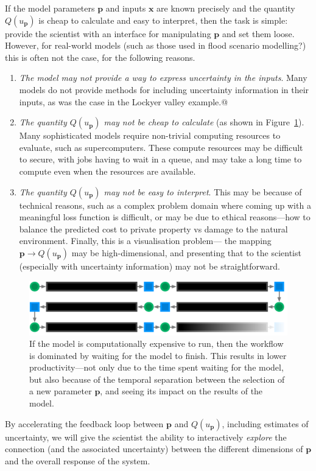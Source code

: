\documentclass[a4paper,fontsize=12pt]{scrartcl}
\begin{document}
If the model parameters $\mathbf{p}$ and inputs $\mathbf{x}$ are known
precisely and the quantity $Q(u_{\mathbf{p}})$ is cheap to calculate
and easy to interpret, then the task is simple: provide the scientist
with an interface for manipulating $\mathbf{p}$ and set them loose.
However, for real-world models (such as those used in flood scenario
modelling?) this is often not the case, for the following reasons.
\begin{enumerate}
\item \emph{The model may not provide a way to express uncertainty in
    the inputs}. Many models do not provide methods for including
  uncertainty information in their inputs, as was the case in the
  Lockyer valley example.@
\item \emph{The quantity $Q(u_{\mathbf{p}})$ may not be cheap to
    calculate} (as shown in Figure~\ref{fig:long-fb-loop.pdf}). Many
  sophisticated models require non-trivial computing resources to
  evaluate, such as supercomputers. These compute resources may be
  difficult to secure, with jobs having to wait in a queue, and may
  take a long time to compute even when the resources are available.
\item \emph{The quantity $Q(u_{\mathbf{p}})$ may not be easy to
    interpret}. This may be because of technical reasons, such as a
  complex problem domain where coming up with a meaningful loss
  function is difficult, or may be due to ethical reasons---how to
  balance the predicted cost to private property vs damage to the
  natural environment. Finally, this is a visualisation problem---
  the mapping $\mathbf{p} \rightarrow Q(u_{\mathbf{p}})$ may be high-dimensional,
  and presenting that to the scientist (especially with uncertainty
  information) may not be straightforward.
\end{enumerate}
\begin{figure}
  \centering
  \includegraphics[width=\textwidth]{figures/long-fb-loop.pdf}
  \caption{If the model is computationally expensive to run, then the
    workflow is dominated by waiting for the model to finish. This
    results in lower productivity---not only due to the time spent
    waiting for the model, but also because of the temporal separation
  between the selection of a new parameter $\mathbf{p}$, and seeing
  its impact on the results of the model.}
  \label{fig:long-fb-loop.pdf}
\end{figure}
By accelerating the feedback loop between $\mathbf{p}$ and
$Q(u_{\mathbf{p}})$, including estimates of uncertainty, we will give
the scientist the ability to interactively \emph{explore} the
connection (and the associated uncertainty) between the different
dimensions of $\mathbf{p}$ and the overall response of the
system.
\end{document}
